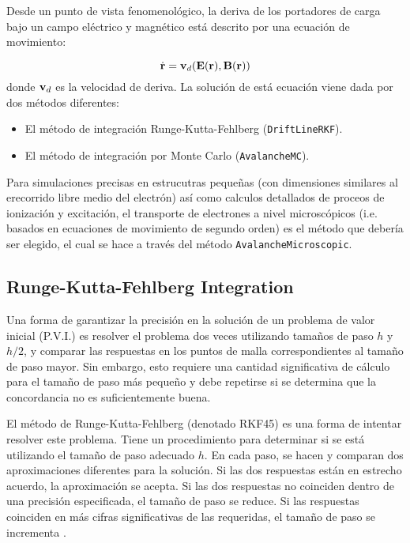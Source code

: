 Desde un punto de vista fenomenológico, la deriva de los portadores de carga bajo un campo eléctrico y magnético está descrito por una ecuación de movimiento: 

\begin{equation}
    \dot{\mathbf{r}} = \mathbf{v}_d(\mathbf{E}(\mathbf{r}),\mathbf{B}(\mathbf{r}))
\end{equation}
donde $\mathbf{v}_d$ es la velocidad de deriva. La solución de está ecuación viene dada por dos métodos diferentes:

\begin{itemize}
    \item El método de integración Runge-Kutta-Fehlberg (\texttt{DriftLineRKF}).
    \item El método de integración por Monte Carlo (\texttt{AvalancheMC}).
\end{itemize}
Para simulaciones precisas en estrucutras pequeñas (con dimensiones similares al erecorrido libre medio del electrón) así como calculos detallados de proceos de ionización y excitación, el transporte de electrones a nivel microscópicos (i.e. basados en ecuaciones de movimiento de segundo orden) es el método que debería ser elegido, el cual se hace a través del método \texttt{AvalancheMicroscopic}.

\subsection{Runge-Kutta-Fehlberg Integration}

Una forma de garantizar la precisión en la solución de un problema de valor inicial (P.V.I.) es resolver el problema dos veces utilizando tamaños de paso $h$ y $h/2$, y comparar las respuestas en los puntos de malla correspondientes al tamaño de paso mayor. Sin embargo, esto requiere una cantidad significativa de cálculo para el tamaño de paso más pequeño y debe repetirse si se determina que la concordancia no es suficientemente buena.

El método de Runge-Kutta-Fehlberg (denotado RKF45) es una forma de intentar resolver este problema. Tiene un procedimiento para determinar si se está utilizando el tamaño de paso adecuado $h$. En cada paso, se hacen y comparan dos aproximaciones diferentes para la solución. Si las dos respuestas están en estrecho acuerdo, la aproximación se acepta. Si las dos respuestas no coinciden dentro de una precisión especificada, el tamaño de paso se reduce. Si las respuestas coinciden en más cifras significativas de las requeridas, el tamaño de paso se incrementa \cite{MathewsFink2004}.

